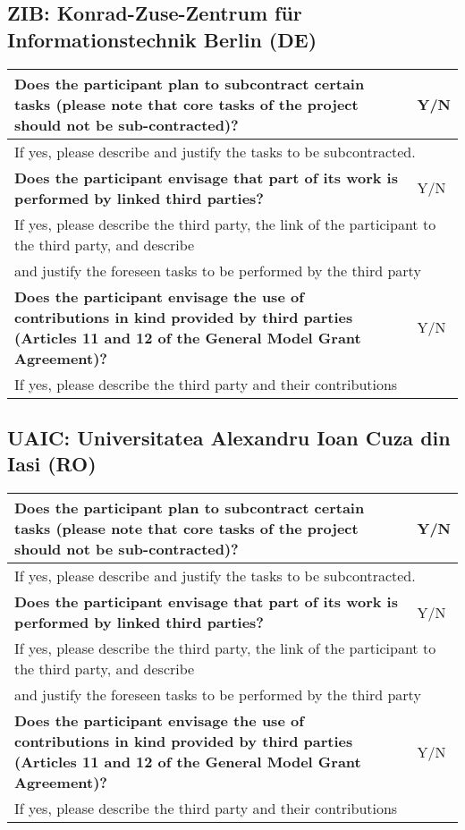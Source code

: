 \subsection{ZIB: Konrad-Zuse-Zentrum für Informationstechnik Berlin (DE)}

\begin{longtable}{|p{}|p{}|}
\hline
{\bf Does the participant plan to subcontract certain tasks (please
  note that core tasks of the project should not be sub-contracted)?}
&
Y/N
\\
\hline
\multicolumn{2}{|l|}{
If yes, please describe and justify the tasks to be subcontracted.}
\\
\hline
{\bf Does the participant envisage that  part of its work is performed
  by linked third parties?}
&
Y/N
\\
\hline
\multicolumn{2}{|l|}{If yes, please describe the third party, the link of the
  participant to the third party, and describe}\\
\multicolumn{2}{|l|}{and justify the foreseen
tasks to be performed by the third party}
\\
\hline
{\bf Does the participant envisage the use of contributions in kind
provided by third parties (Articles 11 and 12 of the General Model
Grant Agreement)?}
&
Y/N
\\
\hline
\multicolumn{2}{|l|}{If yes, please describe the third party and their contributions}
\\
\hline
\end{longtable}


\subsection{UAIC: Universitatea Alexandru Ioan Cuza din Iasi (RO)}

\begin{longtable}{|p{}|p{}|}
\hline
{\bf Does the participant plan to subcontract certain tasks (please
  note that core tasks of the project should not be sub-contracted)?}
&
Y/N
\\
\hline
\multicolumn{2}{|l|}{
If yes, please describe and justify the tasks to be subcontracted.}
\\
\hline
{\bf Does the participant envisage that  part of its work is performed
  by linked third parties?}
&
Y/N
\\
\hline
\multicolumn{2}{|l|}{If yes, please describe the third party, the link of the
  participant to the third party, and describe}\\
\multicolumn{2}{|l|}{and justify the foreseen
tasks to be performed by the third party}
\\
\hline
{\bf Does the participant envisage the use of contributions in kind
provided by third parties (Articles 11 and 12 of the General Model
Grant Agreement)?}
&
Y/N
\\
\hline
\multicolumn{2}{|l|}{If yes, please describe the third party and their contributions}
\\
\hline
\end{longtable}


